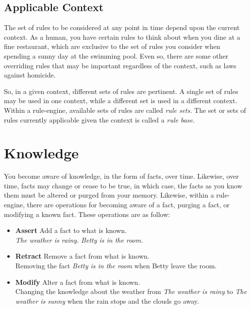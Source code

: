 \subsection{Applicable Context}

The set of rules to be considered at any point in time depend upon the
current context.  As a human, you have certain rules to think about
when you dine at a fine restaurant, which are exclusive to the set of
rules you consider when spending a sunny day at the swimming pool.
Even so, there are some other overriding rules that may be important
regardless of the context, such as laws against homicide.

So, in a given context, different sets of rules are pertinent.  A
single set of rules may be used in one context, while a different set
is used in a different context. Within a rule-engine, available sets 
of rules are called \emph{rule sets}.  The set or 
sets of rules currently applicable given the context is called a 
\emph{rule base}.

\section{Knowledge}

You become aware of knowledge, in the form of facts, over time.
Likewise, over time, facts may change or cease to be true, in 
which case, the facts as you know them must be altered or purged
from your memory.  Likewise, within a rule-engine, there are
operations for becoming aware of a fact, purging a fact, or
modifying a known fact.  These operations are as follow:

\begin{itemize}
  \item \textbf{Assert} Add a fact to what is known.\\
    \emph{The weather is rainy.} \emph{Betty is in the room.}
  \item \textbf{Retract} Remove a fact from what is known.\\
    Removing the fact \emph{Betty is in the room} when Betty leave the
    room.
  \item \textbf{Modify} Alter a fact from what is known.\\
    Changing the knowledge about the weather from \emph{The weather is
    rainy} to \emph{The weather is sunny} when the rain stops and the
    clouds go away.
\end{itemize}

